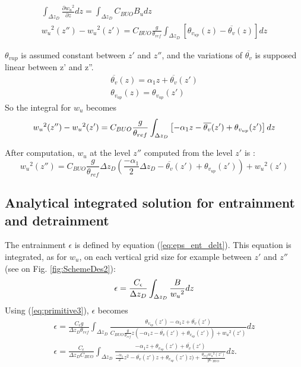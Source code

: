 \begin{eqnarray}
   \int_{\Delta z_D}\frac{\partial{{w_u}^2}}{\partial{z}}dz=\int_{\Delta z_D} C_{BUO} B_u dz\\
   {w_u}^2(z'')-{w_u}^2(z')= C_{BUO}\frac{g}{\theta_{ref}}\int_{\Delta z_D} \left[    \theta_{v_{up}}(z)-\overline{\theta_v}(z)\right]  dz
   \label{eq:primitive1}
\end{eqnarray}

$\theta_{vup}$ is assumed constant between $z'$ and $z''$, and the variations of $\overline{\theta_v}$ is supposed linear between z' and z''.
\begin{eqnarray}
   \overline{\theta_v}(z)= \alpha_1 z + \overline{\theta_v}(z')\\
   \theta_{v_{up}}(z)    = \theta_{v_{up}}(z')
   \label{eq:fonction_lineaire}
\end{eqnarray}
So the integral for $w_u$ becomes
\begin{equation}
   {w_u}^2(z'') - {w_u}^2(z')= C_{BUO}\frac{g}{\theta_{ref}}\int_{\Delta z_D} \left[- \alpha_1z - \overline{\theta_v}(z') + \theta_{v_{up}}(z')\right]  dz \\
   \label{eq:primitive2}
\end{equation}

After computation, $w_u$ at the level $z''$ computed from the level $z'$ is :
\begin{equation}
   {w_u}^2(z'')= C_{BUO}\frac{g}{\theta_{ref}} \Delta z_D(\frac{ - \alpha_1}{2}\Delta z_D - \overline{\theta_v}(z') + \theta_{v_{up}}(z')) + {w_u}^2(z') 
   \label{eq:primitive3}
\end{equation}


\subsection{Analytical integrated solution for entrainment and detrainment}
\label{sec:annexe_e}

The entrainment $\epsilon$ is defined by equation (\ref{eq:eps_ent_delt}). This equation is integrated, as for $w_u$, on each vertical grid size for example between $z'$ and $z''$ (see on Fig. \ref{fig:SchemeDes2}):
\begin{equation}
   \epsilon = \frac{C_{\epsilon}}{\Delta z_D}\int_{\Delta z_D} \frac{B}{{w_u}^2}dz\\
   \label{eq:primitive4}
\end{equation}
Using (\ref{eq:primitive3}), $\epsilon$ becomes
\begin{eqnarray}
   \epsilon = \frac{C_{\epsilon}g}{\Delta z_D \theta_{ref}}\int_{\Delta z_D} \frac{ \theta_{v_{up}}(z') - \alpha_1 z +  \overline{\theta_v}(z')} {C_{BUO}\frac{g}{\theta_{ref}} z( - \alpha_1 z - \overline{\theta_v}(z') + \theta_{v_{up}}(z')) + {w_u}^2(z')}dz\\
   \epsilon = \frac{C_{\epsilon}}{\Delta z_D C_{BUO}}\int_{\Delta z_D} \frac{- \alpha_1 z + \theta_{v_{up}}(z') +  \overline{\theta_v}(z')} { \frac{- \alpha_1}{2}z^2 - \overline{\theta_v}(z')z + \theta_{v_{up}}(z')z) + \frac{\theta_{ref} {w_u}^2(z')} {g C_{BUO}}}dz.
   \label{eq:primitive5}
\end{eqnarray}

